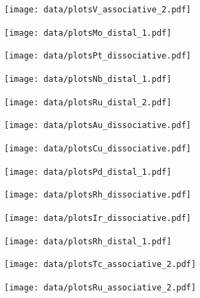 \begin{figure}
\centering
\texttt{[image: data/plotsV\_associative\_2.pdf]}
\end{figure}

\begin{figure}
\centering
\texttt{[image: data/plotsMo\_distal\_1.pdf]}
\end{figure}

\begin{figure}
\centering
\texttt{[image: data/plotsPt\_dissociative.pdf]}
\end{figure}

\begin{figure}
\centering
\texttt{[image: data/plotsNb\_distal\_1.pdf]}
\end{figure}

\begin{figure}
\centering
\texttt{[image: data/plotsRu\_distal\_2.pdf]}
\end{figure}

\begin{figure}
\centering
\texttt{[image: data/plotsAu\_dissociative.pdf]}
\end{figure}

\begin{figure}
\centering
\texttt{[image: data/plotsCu\_dissociative.pdf]}
\end{figure}

\begin{figure}
\centering
\texttt{[image: data/plotsPd\_distal\_1.pdf]}
\end{figure}

\begin{figure}
\centering
\texttt{[image: data/plotsRh\_dissociative.pdf]}
\end{figure}

\begin{figure}
\centering
\texttt{[image: data/plotsIr\_dissociative.pdf]}
\end{figure}

\begin{figure}
\centering
\texttt{[image: data/plotsRh\_distal\_1.pdf]}
\end{figure}

\begin{figure}
\centering
\texttt{[image: data/plotsTc\_associative\_2.pdf]}
\end{figure}

\begin{figure}
\centering
\texttt{[image: data/plotsRu\_associative\_2.pdf]}
\end{figure}

